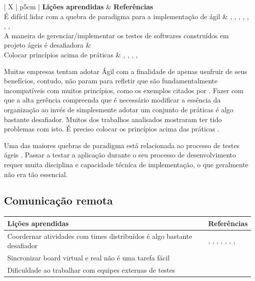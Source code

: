 \begin{table}[H]
	\centering
	\begin{tabularx}{\linewidth}{ | X | p{5cm} | } \hline \textbf{Lições aprendidas} & \textbf{Referências} \\ \hline
		É difícil lidar com a quebra de paradigma para a implementação de ágil & \cite{Hajjdiab2011}, \cite{Block2011}, \cite{Korhonen2010}, \cite{Lapham2012}, \cite{Arikpo2011}, \cite{Stefano2013}, \cite{Bastos2013}, \cite{Maciel2013} \\ \hline
		A maneira de gerenciar/implementar os testes de softwares construídos em projeto ágeis é desafiadora & \cite{Korhonen2010} \\ \hline
		Colocar princípios acima de práticas & \cite{Maciel2013}, \cite{Parzinello2012}, \cite{Hui2013}, \cite{Ahmed2008}, \cite{Sahota2012} \\ \hline
	\end{tabularx}
\end{table}

Muitas empresas tentam adotar Ágil com a finalidade de apenas usufruir de seus benefícios, contudo, não param para refletir que são fundamentalmente incompatíveis com muitos princípios, como os exemplos citados por \cite{Lapham2012,Bastos2013}. Fazer com que a alta gerência compreenda que é necessário modificar a essência da organização ao invés de simplesmente adotar um conjunto de práticas é algo bastante desafiador. Muitos dos trabalhos analisados mostraram ter tido problemas com isto. É preciso colocar os princípios acima das práticas \cite{Maciel2013}.

Uma das maiores quebras de paradigma está relacionada ao processo de testes ágeis \cite{Korhonen2010}. Passar a testar a aplicação durante o seu processo de desenvolvimento requer muita disciplina e capacidade técnica de implementação, o que geralmente não era tão essencial.

\subsection{Comunicação remota}

\begin{table}[H]
	\centering
	\begin{tabularx}{\linewidth}{ | X | p{5cm} | } \hline \textbf{Lições aprendidas} & \textbf{Referências} \\ \hline
		Coordernar atividades com times distribuídos é algo bastante desafiador & \cite{Adobe2012}, \cite{Microsoft2013}, \cite{Korhonen2010}, \cite{Radha2012}, \cite{Rodrigues2013}, \cite{Vieira2013}, \cite{Bastos2013}, \cite{Maciel2013} \\ \hline
		Sincronizar board virtual e real não é uma tarefa fácil & \cite{Vieira2013} \\ \hline
		Dificuldade ao trabalhar com equipes externas de testes & \cite{Bastos2013} \\ \hline
	\end{tabularx}
\end{table}

